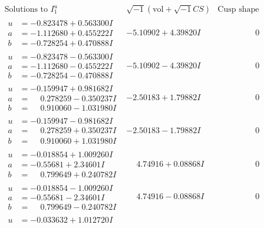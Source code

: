 \documentclass[1p]{elsarticle_modified}
\theoremstyle{definition}
\newcommand{\I}{\sqrt{-1}}
\begin{document}
$$\begin{array}{c|c|c}  
\text{Solutions to }I^u_{1}& \I (\text{vol} + \sqrt{-1}CS) & \text{Cusp shape}\\
 \hline 
\begin{aligned}
u &= -0.823478 + 0.563300 I \\
a &= -1.112680 + 0.455222 I \\
b &= -0.728254 + 0.470888 I\end{aligned}
 & -5.10902 + 4.39820 I & \phantom{-0.000000 } 0 \\ \hline\begin{aligned}
u &= -0.823478 - 0.563300 I \\
a &= -1.112680 - 0.455222 I \\
b &= -0.728254 - 0.470888 I\end{aligned}
 & -5.10902 - 4.39820 I & \phantom{-0.000000 } 0 \\ \hline\begin{aligned}
u &= -0.159947 + 0.981682 I \\
a &= \phantom{-}0.278259 - 0.350237 I \\
b &= \phantom{-}0.910060 - 1.031980 I\end{aligned}
 & -2.50183 + 1.79882 I & \phantom{-0.000000 } 0 \\ \hline\begin{aligned}
u &= -0.159947 - 0.981682 I \\
a &= \phantom{-}0.278259 + 0.350237 I \\
b &= \phantom{-}0.910060 + 1.031980 I\end{aligned}
 & -2.50183 - 1.79882 I & \phantom{-0.000000 } 0 \\ \hline\begin{aligned}
u &= -0.018854 + 1.009260 I \\
a &= -0.55681 + 2.34601 I \\
b &= \phantom{-}0.799649 + 0.240782 I\end{aligned}
 & \phantom{-}4.74916 + 0.08868 I & \phantom{-0.000000 } 0 \\ \hline\begin{aligned}
u &= -0.018854 - 1.009260 I \\
a &= -0.55681 - 2.34601 I \\
b &= \phantom{-}0.799649 - 0.240782 I\end{aligned}
 & \phantom{-}4.74916 - 0.08868 I & \phantom{-0.000000 } 0 \\ \hline\begin{aligned}
u &= -0.033632 + 1.012720 I \\

\end{aligned}
\end{array}$$
\end{document}
